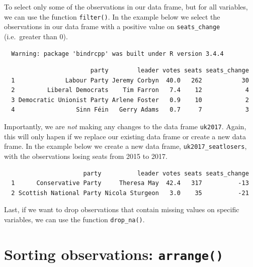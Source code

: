 \documentclass[12pt,oneside]{reedthesis}
\theoremstyle{definition}
\theoremstyle{definition}
\theoremstyle{definition}
\theoremstyle{remark}
\begin{document}
  To select only some of the observations in our data frame, but for all
  variables, we can use the function \texttt{filter()}. In the example
  below we select the observations in our data frame with a positive value
  on \texttt{seats\_change} (i.e.~greater than 0).
  \begin{Shaded}
  \begin{Highlighting}[]
  \OperatorTok{>}\StringTok{ }\NormalTok{)}
  \end{Highlighting}
  \end{Shaded}
  \begin{verbatim}
  Warning: package 'bindrcpp' was built under R version 3.4.4
  \end{verbatim}
  \begin{verbatim}
                        party        leader votes seats seats_change
  1              Labour Party Jeremy Corbyn  40.0   262           30
  2         Liberal Democrats    Tim Farron   7.4    12            4
  3 Democratic Unionist Party Arlene Foster   0.9    10            2
  4                 Sinn Féin   Gerry Adams   0.7     7            3
  \end{verbatim}
  Importantly, we are \emph{not} making any changes to the data frame
  \texttt{uk2017}. Again, this will only hapen if we replace our existing
  data frame or create a new data frame. In the example below we create a
  new data frame, \texttt{uk2017\_seatlosers}, with the observations
  losing seats from 2015 to 2017.
  \begin{Shaded}
  \begin{Highlighting}[]
  \StringTok{ }\OperatorTok{<}\StringTok{ }\NormalTok{)}
  \end{Highlighting}
  \end{Shaded}
  \begin{verbatim}
                      party          leader votes seats seats_change
  1      Conservative Party     Theresa May  42.4   317          -13
  2 Scottish National Party Nicola Sturgeon   3.0    35          -21
  \end{verbatim}
  Last, if we want to drop observations that contain missing values on
  specific variables, we can use the function \texttt{drop\_na()}.
  
  \section{\texorpdfstring{Sorting observations:
  \texttt{arrange()}}{Sorting observations: arrange()}}\label{sorting-observations-arrange}
  
\end{document}
